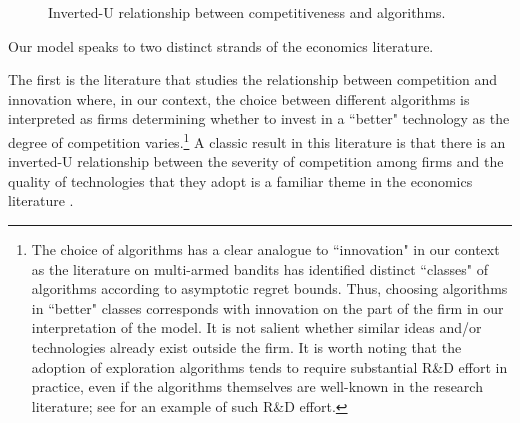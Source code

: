 \begin{figure}
\begin{center}

\caption{Inverted-U relationship between competitiveness and algorithms.}
\label{fig:inverted-U}
\end{center}
\end{figure}
 Our model speaks to two distinct strands of the economics literature.

The first is the literature that studies the relationship between competition and innovation where, in our context,  the choice between different algorithms is interpreted as firms determining whether to invest in a ``better" technology as the degree of competition varies.\footnote{The choice of algorithms has a clear analogue to ``innovation" in our context as the literature on multi-armed bandits has identified distinct ``classes" of algorithms according to asymptotic regret bounds. Thus, choosing algorithms in ``better" classes corresponds with innovation on the part of the firm in our interpretation of the model. It is not salient whether similar ideas and/or technologies already exist outside the firm. It is worth noting that the adoption of exploration algorithms tends to require substantial R\&D effort in practice, even if the algorithms themselves are well-known in the research literature; see \citet{MWT-WhitePaper-2016} for an example of such R\&D effort.} A classic result in this literature is that there is an inverted-U relationship between the severity of competition among firms and the quality of technologies that they adopt is a familiar theme in the economics literature \citep[\eg][]{Aghion-QJE05,Vives-08}. 

